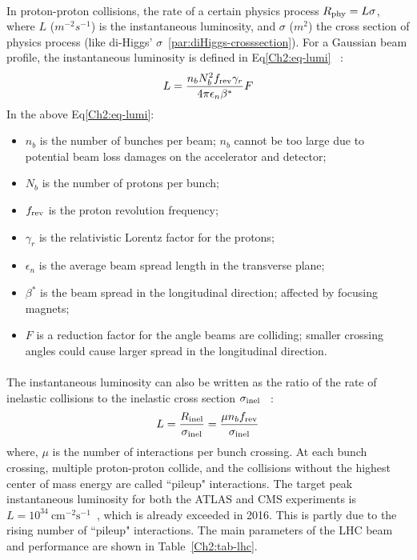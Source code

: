 \paragraph{} 
In proton-proton collisions, the rate of a certain physics process $R_{\rm phy} = L\sigma$, where $L$ ($m^{-2}s^{-1}$) is the instantaneous luminosity, and $\sigma$ ($m^2$) the cross section of physics process (like di-Higgs' $\sigma$~\ref{par:diHiggs-crosssection}). For a Gaussian beam profile, the instantaneous luminosity is defined in Eq\ref{Ch2:eq-lumi} ~\cite{LHCReview}:
%
\begin{equation}
\label{Ch2:eq-lumi}
L = \frac{n_b N_b^2 f_{\rm rev} \gamma_r}{4\pi \epsilon_n \beta^*} F
\end{equation}
%
In the above Eq\ref{Ch2:eq-lumi}:
\begin{itemize}
	\item $n_b$ is the number of bunches per beam; $n_b$ cannot be too large due to potential beam loss damages on the accelerator and detector; %
	\item $N_b$ is the number of protons per bunch;  
	\item $f_{\rm rev}$ is the proton revolution frequency;
	\item $\gamma_r$ is the relativistic Lorentz factor for the protons;
	\item $\epsilon_n$ is the average beam spread length in the transverse plane;
	\item $\beta^*$ is the beam spread in the longitudinal direction; affected by focusing magnets;
	\item $F$ is a reduction factor for the angle beams are colliding; smaller crossing angles could cause larger spread in the longitudinal direction.
\end{itemize}

\paragraph{}
The instantaneous luminosity can also be written as the ratio of the rate of inelastic collisions to the inelastic cross section $\sigma_{\rm inel}$ ~\cite{lumi-paper}:
\begin{equation}
\label{Ch2:eq-lumi2}
L = \frac{R_{\rm inel}}{\sigma_{\rm inel}} = \frac{\mu n_b f_{\rm rev}}{\sigma_{\rm inel}}
\end{equation}
where, $\mu$ is the number of interactions per bunch crossing. At each bunch crossing, multiple proton-proton collide, and the collisions without the highest center of mass energy are called ``pileup" interactions.
The target peak instantaneous luminosity for both the ATLAS and CMS experiments is $L=10^{34}~\text{cm}^{-2}\text{s}^{-1}$~\cite{LHCPaper}, which is already exceeded in 2016. This is partly due to the rising number of ``pileup" interactions. The main parameters of the LHC beam and performance are shown in Table~\ref{Ch2:tab-lhc}. 

